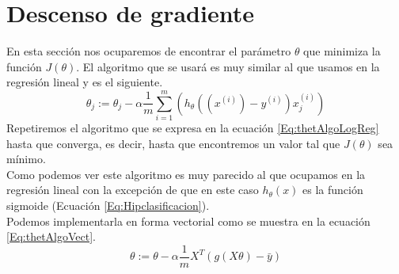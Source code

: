 \documentclass{report}
\begin{document}
\section{Descenso de gradiente}
En esta sección nos ocuparemos de encontrar el parámetro $ \theta $ que minimiza la función $ J(\theta) $. El algoritmo que se usará es muy similar al que usamos en la regresión lineal y es el siguiente.
\begin{equation}
	\theta_j:=\theta_j-\alpha\frac{1}{m}\sum_{i=1}^{m}(h_\theta((x^{(i)})-y^{(i)})x_j^{(i)})
	\label{Eq:thetAlgoLogReg}
\end{equation}
Repetiremos el algoritmo que se expresa en la ecuación \ref{Eq:thetAlgoLogReg} hasta que converga, es decir, hasta que encontremos un valor tal que $ J(\theta) $ sea mínimo.\\Como podemos ver este algoritmo es muy parecido al que ocupamos en la regresión lineal con la excepción de que en este caso $ h_\theta(x) $ es la función sigmoide (Ecuación \ref{Eq:Hipclasificacion}).\\Podemos implementarla en forma vectorial como se muestra en la ecuación \ref{Eq:thetAlgoVect}.
\begin{equation}
	\theta:=\theta-\alpha\frac{1}{m}X^T(g(X\theta)-\bar{y})
	\label{Eq:thetAlgoVect}
\end{equation}
\newpage
\end{document}
